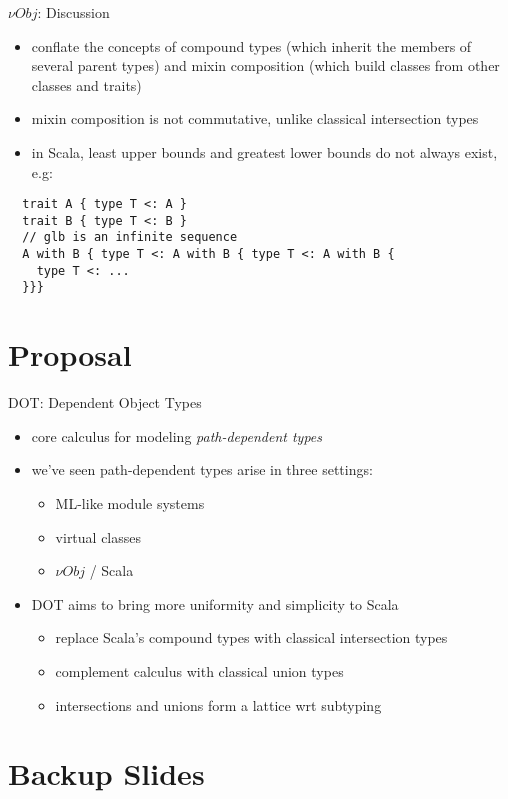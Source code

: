 \documentclass{beamer}
\begin{document}
\begin{frame}[fragile]{${\nu}Obj$: Discussion}
\begin{itemize}
\item conflate the concepts of compound types (which inherit the
  members of several parent types) and mixin composition (which build
  classes from other classes and traits)
\item mixin composition is not commutative, unlike classical
  intersection types
\item in Scala, least upper bounds and greatest lower bounds do not always exist, e.g: %
\end{itemize}
\begin{verbatim}
  trait A { type T <: A }
  trait B { type T <: B }
  // glb is an infinite sequence
  A with B { type T <: A with B { type T <: A with B {
    type T <: ...
  }}}
\end{verbatim}
\end{frame}

\section{Proposal}
\begin{frame}{DOT: Dependent Object Types}
\begin{itemize}
\item core calculus for modeling {\it path-dependent types}
\item we've seen path-dependent types arise in three settings:
\begin{itemize}
\item ML-like module systems
\item virtual classes
\item ${\nu}Obj$ / Scala
\end{itemize}
\item DOT aims to bring more uniformity and simplicity to Scala
\begin{itemize}
\item replace Scala's compound types with classical intersection types
\item complement calculus with classical union types
\item intersections and unions form a lattice wrt subtyping
\end{itemize}
\end{itemize}
\end{frame}

\section{Backup Slides}
\end{document}

